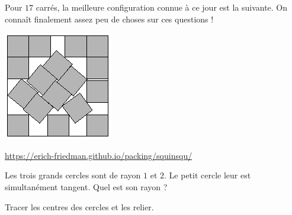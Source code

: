 \begin{exo}
Pour $17$ carrés, la meilleure configuration connue à ce jour est la suivante. On connaît finalement assez peu de choses sur ces questions !
\begin{center}
\includegraphics[scale=.5]{sqinsq/s17.png}
\end{center}
\begin{hint}
\end{hint}
\begin{sol}
\url{https://erich-friedman.github.io/packing/squinsqu/}
\end{sol}
\end{exo}













\begin{exo}
Les trois grands  cercles sont de rayon $1$ et $2$.
Le petit cercle leur est simultanément tangent. Quel est son rayon ?
\begin{center}
\end{center}
\begin{hint}
Tracer les centres des cercles et les relier.
\end{hint}
\end{exo}

